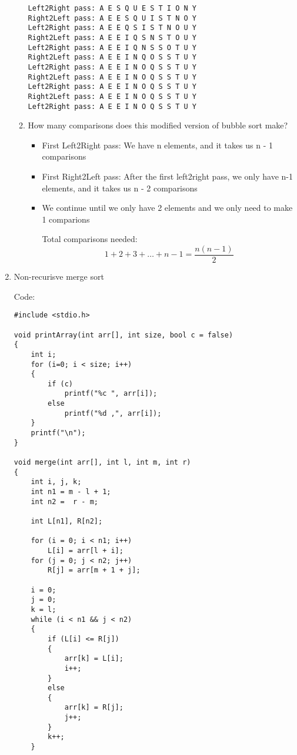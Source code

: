 \documentclass[11pts]{report}
\begin{document}
\begin{enumerate}
\begin{enumerate}
\begin{lstlisting}
Left2Right pass: A E S Q U E S T I O N Y 
Right2Left pass: A E E S Q U I S T N O Y 
Left2Right pass: A E E Q S I S T N O U Y 
Right2Left pass: A E E I Q S N S T O U Y 
Left2Right pass: A E E I Q N S S O T U Y 
Right2Left pass: A E E I N Q O S S T U Y 
Left2Right pass: A E E I N O Q S S T U Y 
Right2Left pass: A E E I N O Q S S T U Y 
Left2Right pass: A E E I N O Q S S T U Y 
Right2Left pass: A E E I N O Q S S T U Y 
Left2Right pass: A E E I N O Q S S T U Y 
\end{lstlisting}

\item How many comparisons does this modified version of bubble sort make?
\begin{itemize}
\item First Left2Right pass: We have n elements, and it takes us n - 1 comparisons
\item First Right2Left pass: After the first left2right pass, we only have n-1 elements, and it takes us n - 2 comparisons
\item We continue until we only have 2 elements and we only need to make 1 comparions
\par Total comparisons needed:
\begin{equation*}
1 + 2 + 3 + \hdots + n - 1 = \frac{n(n-1)}{2}
\end{equation*}
\end{itemize}
\end{enumerate}

\item Non-recurisve merge sort
\par Code:

\begin{lstlisting}
#include <stdio.h>

void printArray(int arr[], int size, bool c = false)
{
    int i;
    for (i=0; i < size; i++)
    {
        if (c)
            printf("%c ", arr[i]);
        else
            printf("%d ,", arr[i]);
    }
    printf("\n");
}

void merge(int arr[], int l, int m, int r) 
{ 
    int i, j, k; 
    int n1 = m - l + 1; 
    int n2 =  r - m; 
  
    int L[n1], R[n2]; 
  
    for (i = 0; i < n1; i++) 
        L[i] = arr[l + i]; 
    for (j = 0; j < n2; j++) 
        R[j] = arr[m + 1 + j]; 
  
    i = 0;  
    j = 0; 
    k = l; 
    while (i < n1 && j < n2) 
    { 
        if (L[i] <= R[j]) 
        { 
            arr[k] = L[i]; 
            i++; 
        } 
        else
        { 
            arr[k] = R[j]; 
            j++; 
        } 
        k++; 
    } 
  

\end{lstlisting}
\end{enumerate}
\end{document}
